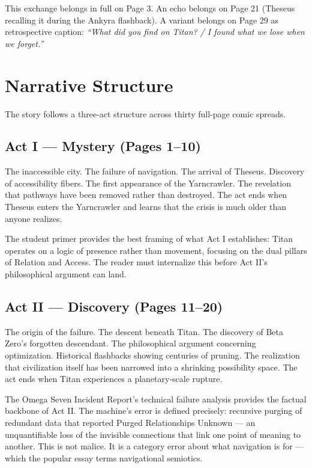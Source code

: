 \documentclass[11pt]{article}
\begin{document}
This exchange belongs in full on Page 3. An echo belongs on Page 21 (Theseus recalling it during the Ankyra flashback). A variant belongs on Page 29 as retrospective caption: \textit{``What did you find on Titan? / I found what we lose when we forget.''}

\section{Narrative Structure}

The story follows a three-act structure across thirty full-page comic spreads.

\subsection{Act I --- Mystery (Pages 1--10)}

The inaccessible city. The failure of navigation. The arrival of Theseus. Discovery of accessibility fibers. The first appearance of the Yarncrawler. The revelation that pathways have been removed rather than destroyed. The act ends when Theseus enters the Yarncrawler and learns that the crisis is much older than anyone realizes.

The student primer provides the best framing of what Act I establishes: Titan operates on a logic of presence rather than movement, focusing on the dual pillars of Relation and Access. The reader must internalize this before Act II's philosophical argument can land.

\subsection{Act II --- Discovery (Pages 11--20)}

The origin of the failure. The descent beneath Titan. The discovery of Beta Zero's forgotten descendant. The philosophical argument concerning optimization. Historical flashbacks showing centuries of pruning. The realization that civilization itself has been narrowed into a shrinking possibility space. The act ends when Titan experiences a planetary-scale rupture.

The Omega Seven Incident Report's technical failure analysis provides the factual backbone of Act II. The machine's error is defined precisely: recursive purging of redundant data that reported Purged Relationships Unknown --- an unquantifiable loss of the invisible connections that link one point of meaning to another. This is not malice. It is a category error about what navigation is for --- which the popular essay terms navigational semiotics.
\end{document}
